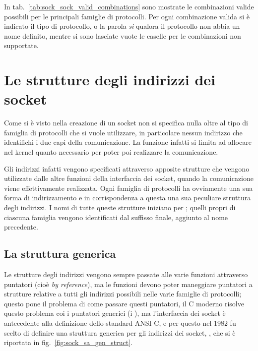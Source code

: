 
In tab.~\ref{tab:sock_sock_valid_combinations} sono mostrate le combinazioni
valide possibili per le principali famiglie di protocolli. Per ogni
combinazione valida si è indicato il tipo di protocollo, o la parola
\textsl{si} qualora il protocollo non abbia un nome definito, mentre si sono
lasciate vuote le caselle per le combinazioni non supportate.


\section{Le strutture degli indirizzi dei socket}
\label{sec:sock_sockaddr}

Come si è visto nella creazione di un socket non si specifica nulla oltre al
tipo di famiglia di protocolli che si vuole utilizzare, in particolare nessun
indirizzo che identifichi i due capi della comunicazione. La funzione infatti
si limita ad allocare nel kernel quanto necessario per poter poi realizzare la
comunicazione.

Gli indirizzi infatti vengono specificati attraverso apposite strutture che
vengono utilizzate dalle altre funzioni della interfaccia dei socket, quando
la comunicazione viene effettivamente realizzata.  Ogni famiglia di protocolli
ha ovviamente una sua forma di indirizzamento e in corrispondenza a questa una
sua peculiare struttura degli indirizzi. I nomi di tutte queste strutture
iniziano per ; quelli propri di ciascuna famiglia vengono
identificati dal suffisso finale, aggiunto al nome precedente.


\subsection{La struttura generica}
\label{sec:sock_sa_gen}

Le strutture degli indirizzi vengono sempre passate alle varie funzioni
attraverso puntatori (cioè \textit{by reference}), ma le funzioni devono poter
maneggiare puntatori a strutture relative a tutti gli indirizzi possibili
nelle varie famiglie di protocolli; questo pone il problema di come passare
questi puntatori, il C moderno risolve questo problema coi i puntatori
generici (i ), ma l'interfaccia dei socket è antecedente alla
definizione dello standard ANSI C, e per questo nel 1982 fu scelto di definire
una struttura generica per gli indirizzi dei socket, , che si
è riportata in fig.~\ref{fig:sock_sa_gen_struct}.

